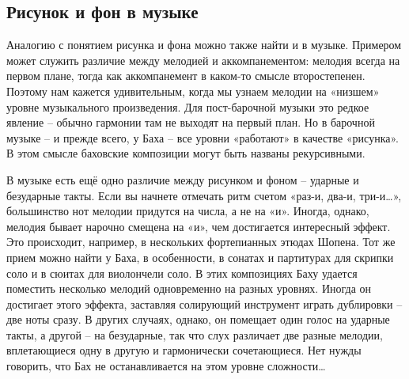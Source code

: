 \documentclass[../main.tex]{subfiles}
\begin{document}


\subsection{Рисунок и фон в музыке}

Аналогию с понятием рисунка и фона можно также найти и в музыке.
Примером может служить различие между мелодией и аккомпанементом: мелодия всегда на первом плане, тогда как аккомпанемент в каком-то смысле второстепенен.
Поэтому нам кажется удивительным, когда мы узнаем мелодии на «низшем» уровне музыкального произведения.
Для пост-барочной музыки это редкое явление \--- обычно гармонии там не выходят на первый план.
Но в барочной музыке \--- и прежде всего, у Баха \--- все уровни «работают» в качестве «рисунка».
В этом смысле баховские композиции могут быть названы рекурсивными.

В музыке есть ещё одно различие между рисунком и фоном \--- ударные и безударные такты.
Если вы начнете отмечать ритм счетом «раз-и, два-и, три-и\ldots», большинство нот мелодии придутся на числа, а не на «и».
Иногда, однако, мелодия бывает нарочно смещена на «и», чем достигается интересный эффект.
Это происходит, например, в нескольких фортепианных этюдах Шопена.
Тот же прием можно найти у Баха, в особенности, в сонатах и партитурах для скрипки соло и в сюитах для виолончели соло.
В этих композициях Баху удается поместить несколько мелодий одновременно на разных уровнях.
Иногда он достигает этого эффекта, заставляя солирующий инструмент играть дублировки \--- две ноты сразу.
В других случаях, однако, он помещает один голос на ударные такты, а другой \--- на безударные, так что слух различает две разные мелодии, вплетающиеся одну в другую и гармонически сочетающиеся.
Нет нужды говорить, что Бах не останавливается на этом уровне сложности\ldots{}
\end{document}
